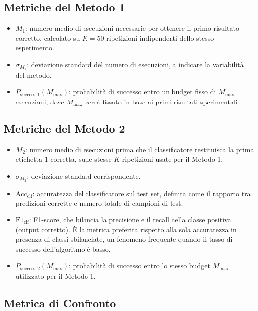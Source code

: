 \begin{onehalfspace}
\subsection{Metriche del Metodo 1}

\begin{itemize}
    \item $\bar{M}_1$: numero medio di esecuzioni necessarie per ottenere il primo risultato corretto, calcolato su $K = 50$ ripetizioni indipendenti dello stesso esperimento.
    \item $\sigma_{M_1}$: deviazione standard del numero di esecuzioni, a indicare la variabilità del metodo.
    \item $P_{\text{success},1}(M_{\text{max}})$: probabilità di successo entro un budget fisso di $M_{\text{max}}$ esecuzioni, dove $M_{\text{max}}$ verrà fissato in base ai primi risultati sperimentali.
\end{itemize}

\subsection{Metriche del Metodo 2}

\begin{itemize}
    \item $\bar{M}_2$: numero medio di esecuzioni prima che il classificatore restituisca la prima etichetta $1$ corretta, sulle stesse $K$ ripetizioni usate per il Metodo 1.
    \item $\sigma_{M_2}$: deviazione standard corrispondente.
    \item $\text{Acc}_{\text{clf}}$: accuratezza del classificatore sul test set, definita come il rapporto tra predizioni corrette e numero totale di campioni di test.
    \item $\text{F1}_{\text{clf}}$: F1-score, che bilancia la precisione e il recall nella classe positiva (output corretto). È la metrica preferita rispetto alla sola accuratezza in presenza di classi sbilanciate, un fenomeno frequente quando il tasso di successo dell'algoritmo è basso.
    \item $P_{\text{success},2}(M_{\text{max}})$: probabilità di successo entro lo stesso budget $M_{\text{max}}$ utilizzato per il Metodo 1.
\end{itemize}

\subsection{Metrica di Confronto}


\end{onehalfspace}
